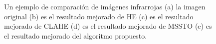 \documentclass[a4paper, 11 pt, conference]{ieeeconf}      %
\begin{document}
\begin{figure}
    \centering
     \\
    \\
    \caption{Un ejemplo de comparaci\'on de im\'agenes infrarrojas (a) la imagen original (b) es el resultado mejorado de HE (c) es el resultado mejorado de CLAHE (d) es el resultado mejorado de MSSTO (e) es el resultado mejorado del algoritmo propuesto.}
    \label{fig:fig3}

\end{figure}
\end{document}
